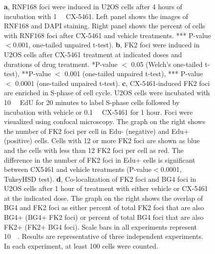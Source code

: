 \begin{figure}
  \caption[]{
        \newline
        \textbf{a}, RNF168 foci were induced in U2OS cells after 4 hours of incubation with \SI{1}{\micro\Molar} CX-5461. Left panel shows the images of RNF168 and DAPI staining. Right panel shows the percent of cells with RNF168 foci after CX-5461 and vehicle treatments. *** P-value$<$0.001, one-tailed unpaired t-test).  
        \newline
        \textbf{b}, FK2 foci were induced in U2OS cells after CX-5461 treatment at indicated doses and durations of drug treatment. *P-value $<$ 0.05 (Welch's one-tailed t-test), **P-value $<$ 0.001 (one-tailed unpaired t-test), *** P-value $<$ 0.0001 (one-tailed unpaired t-test).
        \newline
        \textbf{c}, CX-5461-induced FK2 foci are enriched in S-phase of cell cycle. U2OS cells were incubated with \SI{10}{\micro\Molar} EdU for 20 minutes to label S-phase cells followed by incubation with vehicle or \SI{0.1}{\micro\Molar} CX-5461 for 1 hour. Foci were visualized using confocal microscopy. The graph on the right shows the number of FK2 foci per cell in Edu- (negative) and Edu+ (positive) cells. Cells with 12 or more FK2 foci are shown as blue and the cells with less than 12 FK2 foci per cell as red. The difference in the number of FK2 foci in Edu+ cells is significant between CX5461 and vehicle treatments (P-value$<0$.0001, TukeyHSD test).
        \newline
        \textbf{d}, Co-localization of FK2 foci and BG4 foci in U2OS cells after 1 hour of treatment with either vehicle or CX-5461 at the indicated dose. The graph on the right shows the overlap of BG4 and FK2 foci as either percent of total FK2 foci that are also BG4+ (BG4+ FK2 foci) or percent of total BG4 foci that are also FK2+ (FK2+ BG4 foci). 
        \newline
        Scale bars in all experiments represent \SI{10}{\micro\Molar}. Results are representative of three independent experiments. In each experiment, at least 100 cells were counted.
        }
 \end{figure}
 \clearpage

